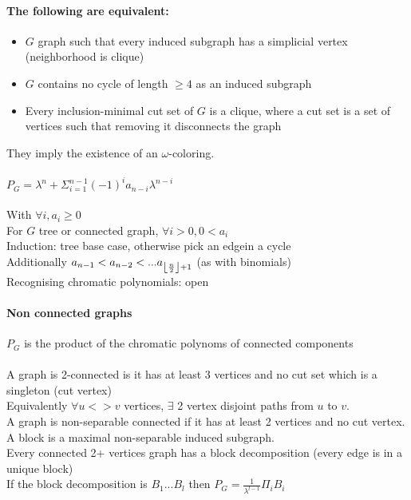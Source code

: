 \documentclass[12pt]{article}
\DeclarePairedDelimiter\floor{\lfloor}{\rfloor}
\begin{document}
\paragraph{The following are equivalent:\\}
\begin{itemize}
\item $G$ graph such that every induced subgraph has a simplicial vertex (neighborhood is clique)
\item $G$ contains no cycle of length $\geqslant 4$ as an induced subgraph
\item Every inclusion-minimal cut set of $G$ is a clique, where a cut set is a set of vertices such that removing it disconnects the graph
\end{itemize}
They imply the existence of an $\omega$-coloring.\\

\paragraph{$P_G = \lambda^n + \Sigma_{i=1}^{n-1} (-1)^i a_{n-i} \lambda^{n-i}$\\}
With $\forall i, a_i \geqslant 0$\\

For $G$ tree or connected graph, $\forall i > 0, 0 < a_i$\\
Induction: tree base case, otherwise pick an edgein a cycle\\
Additionally $a_{n-1} < a_{n-2} < ... a_{\floor*{\frac{n}{2}} + 1}$ (as with binomials)\\
Recognising chromatic polynomials: open\\

\paragraph{Non connected graphs\\}
$P_G$ is the product of the chromatic polynoms of connected components\\\\

A graph is 2-connected is it has at least 3 vertices and no cut set which is a singleton (cut vertex)\\
Equivalently $\forall u <> v$ vertices, $\exists$ 2 vertex disjoint paths from $u$ to $v$.\\
A graph is non-separable connected if it has at least 2 vertices and no cut vertex.\\
A block is a maximal non-separable induced subgraph.\\
Every connected 2+ vertices graph has a block decomposition (every edge is in a unique block)\\
If the block decomposition is $B_1 ... B_l$ then $P_G = \frac{1}{\lambda^{l-1}} \Pi_i B_i$\\
\end{document}
